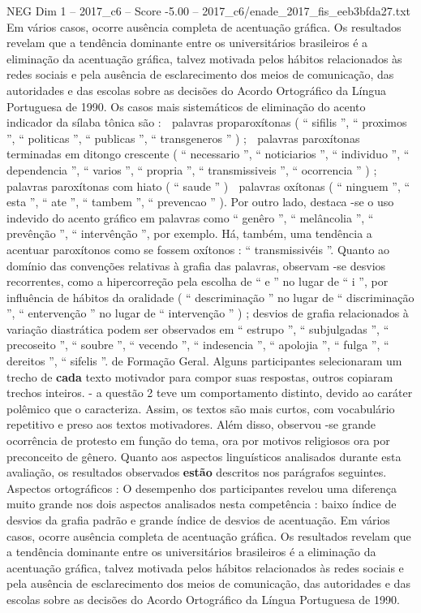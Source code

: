 \begin{textsample}{NEG Dim 1 – 2017\_c6 – Score -5.00 – 2017\_c6/enade\_2017\_fis\_eeb3bfda27.txt}
Em vários casos, ocorre ausência completa de acentuação gráfica.
Os resultados revelam que a tendência dominante entre os universitários brasileiros é a eliminação da acentuação gráfica, talvez motivada pelos hábitos relacionados às redes sociais e pela ausência de esclarecimento dos meios de comunicação, das autoridades e das escolas sobre as decisões do Acordo Ortográfico da Língua Portuguesa de 1990.
Os casos mais sistemáticos de eliminação do acento indicador da sílaba tônica são :  palavras proparoxítonas ( “ sifilis ”, “ proximos ”, “ politicas ”, “ publicas ”, “ transgeneros ” ) ;  palavras paroxítonas terminadas em ditongo crescente ( “ necessario ”, “ noticiarios ”, “ individuo ”, “ dependencia ”, “ varios ”, “ propria ”, “ transmissiveis ”, “ ocorrencia ” ) ;  palavras paroxítonas com hiato ( “ saude ” )  palavras oxítonas ( “ ninguem ”, “ esta ”, “ ate ”, “ tambem ”, “ prevencao ” ).
Por outro lado, destaca -se o uso indevido do acento gráfico em palavras como “ genêro ”, “ melâncolia ”, “ prevênção ”, “ intervênção ”, por exemplo.
Há, também, uma tendência a acentuar paroxítonos como se fossem oxítonos : “ transmissivéis ”.
Quanto ao domínio das convenções relativas à grafia das palavras, observam -se desvios recorrentes, como a hipercorreção pela escolha de “ e ” no lugar de “ i ”, por influência de hábitos da oralidade ( “ descriminação ” no lugar de “ discriminação ”, “ entervenção ” no lugar de “ intervenção ” ) ; desvios de grafia relacionados à variação diastrática podem ser observados em “ estrupo ”, “ subjulgadas ”, “ precoseito ”, “ soubre ”, “ vecendo ”, “ indesencia ”, “ apolojia ”, “ fulga ”, “ dereitos ”, “ sifelis ”. de Formação Geral.
Alguns participantes selecionaram um trecho de \textbf{cada} texto motivador para compor suas respostas, outros copiaram trechos inteiros. - a questão 2 teve um comportamento distinto, devido ao caráter polêmico que o caracteriza.
Assim, os textos são mais curtos, com vocabulário repetitivo e preso aos textos motivadores.
Além disso, observou -se grande ocorrência de protesto em função do tema, ora por motivos religiosos ora por preconceito de gênero.
Quanto aos aspectos linguísticos analisados durante esta avaliação, os resultados observados \textbf{estão} descritos nos parágrafos seguintes.
Aspectos ortográficos : O desempenho dos participantes revelou uma diferença muito grande nos dois aspectos analisados nesta competência : baixo índice de desvios da grafia padrão e grande índice de desvios de acentuação.
Em vários casos, ocorre ausência completa de acentuação gráfica.
Os resultados revelam que a tendência dominante entre os universitários brasileiros é a eliminação da acentuação gráfica, talvez motivada pelos hábitos relacionados às redes sociais e pela ausência de esclarecimento dos meios de comunicação, das autoridades e das escolas sobre as decisões do Acordo Ortográfico da Língua Portuguesa de 1990.

\end{textsample}
